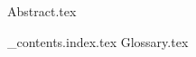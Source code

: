\documentclass{report}
\begin{document}
  \begin{titlepage}
    \centering
    \vspace*{2cm}
    \titleblock [2cm]
    \vspace{1cm}  %
    \authorblock
    \vfill  %
    \location \\
    \dateblock \\
    \footnotesize { \texttt{\fullversion} }
  \end{titlepage}

  \attributionpage

  {Abstract.tex}

  \newpage
  \tableofcontents
  \newpage

  {_contents.index.tex}
  \appendix
  {Glossary.tex}

  \nocite{*}  
  \printbibliography
\end{document}
